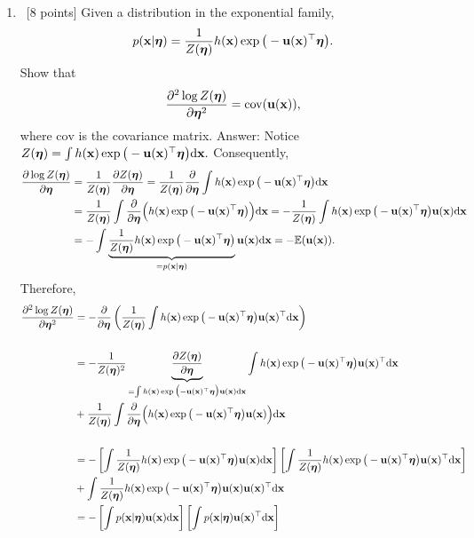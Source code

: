 \documentclass[12pt, fullpage,letterpaper]{article}
\def\red{\color{red}}
\def\blackblue{\color{black!40!blue}}
\begin{document}
\begin{enumerate}
\item~[8 points] Given a distribution in the exponential family, 
\[
p({\bf x}|\boldsymbol{\eta}) = \frac{1}{Z(\boldsymbol{\eta})} h({\bf x})\exp\big(-{\bf u}({\bf x})^\top \boldsymbol{\eta}\big).
\]
Show that 
\[
\frac{\partial^2 \log Z(\boldsymbol{\eta})}{\partial \boldsymbol{\eta}^2} = \mathrm{cov}({\bf u}({\bf x})), 
\]
where $\mathrm{cov}$ is the covariance matrix. 
{\red Answer: }{\blackblue 
Notice 
$Z(\boldsymbol{\eta}) = \int h({\bf x})\exp\big(-{\bf u}({\bf x})^\top \boldsymbol{\eta}\big){\rm d}{\bf x}.$
Consequently, 
\begin{align*}
\frac{\partial \log Z(\boldsymbol{\eta})}{\partial \boldsymbol{\eta}}  
& = \frac{1}{Z(\boldsymbol{\eta}) }\frac{\partial Z(\boldsymbol{\eta})}{\partial \boldsymbol{\eta}}  = \frac{1}{Z(\boldsymbol{\eta}) }\frac{\partial }{\partial \boldsymbol{\eta}} \int h({\bf x})\exp\big(-{\bf u}({\bf x})^\top \boldsymbol{\eta}\big){\rm d}{\bf x}  \\
& = \frac{1}{Z(\boldsymbol{\eta})}  \int \frac{\partial }{\partial \boldsymbol{\eta}}\Big(h({\bf x})\exp\big(-{\bf u}({\bf x})^\top \boldsymbol{\eta}\big)\Big){\rm d}{\bf x} = -\frac{1}{Z(\boldsymbol{\eta})}  \int h({\bf x})\exp\big(-{\bf u}({\bf x})^\top \boldsymbol{\eta}\big){\bf u}({\bf x}){\rm d}{\bf x}\\
& = -\int\underbrace{\frac{1}{Z(\boldsymbol{\eta})}   h({\bf x})\exp\big(-{\bf u}({\bf x})^\top \boldsymbol{\eta}\big)}_{=p({\bf x}|\boldsymbol{\eta})}{\bf u}({\bf x}){\rm d}{\bf x} = -\mathbb{E}({\bf u}({\bf x})).
\end{align*}
Therefore, 
\begin{align*}
\frac{\partial^2 \log Z(\boldeta)}{\partial \boldeta^2}
& = -\frac{\partial }{\partial \boldeta}
\left(\frac{1}{Z(\boldeta)}  \int h(\x)\exp\big(-\u(\x)^\top \boldeta\big)\u(\x)^\top\d\x\right)\\ \\
& = -\frac{1}{Z(\boldeta)^2}\underbrace{\frac{\partial Z(\boldeta)}{\partial \boldeta}}_{= \int h(\x)\exp\big(-\u(\x)^\top \boldeta\big)\u(\x)\d\x}
\int h(\x)\exp\big(-\u(\x)^\top \boldeta\big)\u(\x)^\top\d\x \\
& +  \frac{1}{Z(\boldeta)}  \int \frac{\partial }{\partial \boldeta}\Big(h(\x)\exp\big(-\u(\x)^\top \boldeta\big)\u(\x)\Big)\d\x\\ \\
 & = -\left[\int \frac{1}{Z(\boldeta)}h(\x)\exp\big(-\u(\x)^\top \boldeta\big)\u(\x)\d\x\right]\left[\int \frac{1}{Z(\boldeta)}h(\x)\exp\big(-\u(\x)^\top \boldeta\big)\u(\x)^\top\d\x\right] \\
& +  \int \frac{1}{Z(\boldeta)}  h(\x)\exp\big(-\u(\x)^\top \boldeta\big)\u(\x)\u(\x)^\top\d\x \\
& = -\left[\int p(\x|\boldeta)\u(\x)\d\x\right]\left[\int p(\x|\boldeta)\u(\x)^\top\d\x\right] 

\end{align*}}
\end{enumerate}
\end{document}
